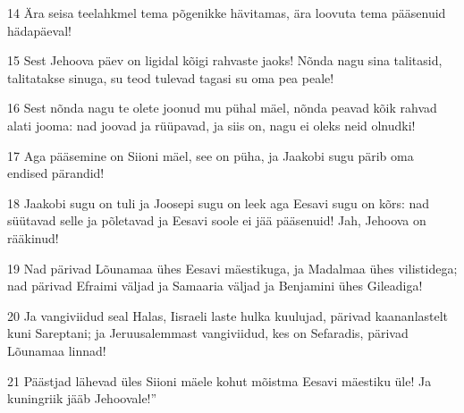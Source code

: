 \par 14 Ära seisa teelahkmel tema põgenikke hävitamas, ära loovuta tema pääsenuid hädapäeval!
\par 15 Sest Jehoova päev on ligidal kõigi rahvaste jaoks! Nõnda nagu sina talitasid, talitatakse sinuga, su teod tulevad tagasi su oma pea peale!
\par 16 Sest nõnda nagu te olete joonud mu pühal mäel, nõnda peavad kõik rahvad alati jooma: nad joovad ja rüüpavad, ja siis on, nagu ei oleks neid olnudki!
\par 17 Aga pääsemine on Siioni mäel, see on püha, ja Jaakobi sugu pärib oma endised pärandid!
\par 18 Jaakobi sugu on tuli ja Joosepi sugu on leek aga Eesavi sugu on kõrs: nad süütavad selle ja põletavad ja Eesavi soole ei jää pääsenuid! Jah, Jehoova on rääkinud!
\par 19 Nad pärivad Lõunamaa ühes Eesavi mäestikuga, ja Madalmaa ühes vilistidega; nad pärivad Efraimi väljad ja Samaaria väljad ja Benjamini ühes Gileadiga!
\par 20 Ja vangiviidud seal Halas, Iisraeli laste hulka kuulujad, pärivad kaananlastelt kuni Sareptani; ja Jeruusalemmast vangiviidud, kes on Sefaradis, pärivad Lõunamaa linnad!
\par 21 Päästjad lähevad üles Siioni mäele kohut mõistma Eesavi mäestiku üle! Ja kuningriik jääb Jehoovale!”

